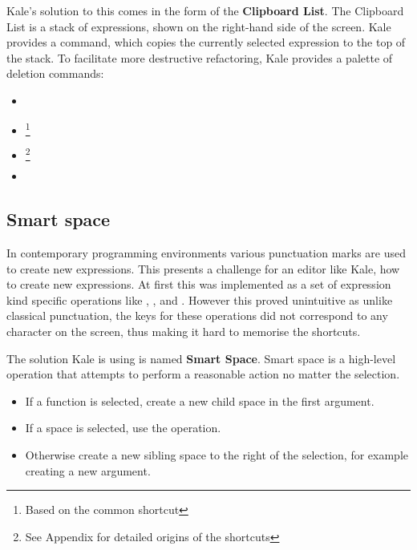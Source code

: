 \documentclass[11pt]{report}
\begin{document}
Kale's solution to this comes in the form of the \textbf{Clipboard List}. The
Clipboard List is a stack of expressions, shown on the right-hand side of the
screen. Kale provides a   command, which copies the currently
selected expression to the top of the stack. To facilitate more destructive
refactoring, Kale provides a palette of deletion commands:

\begin{itemize}[noitemsep]
	\item {} \keys{\backspace}
	\item {} 
		\footnote{Based on the common  shortcut}
	\item {} 
		\footnote{See Appendix for detailed origins of the shortcuts}
	\item {} 
\end{itemize}

\subsection{Smart space}
In contemporary programming environments various punctuation marks are used to
create new expressions. This presents a challenge for an editor like Kale, how
to create new expressions. At first this was implemented as a set of
expression kind specific operations like , , and . However this proved unintuitive as
unlike classical punctuation, the keys for these operations did not correspond
to any character on the screen, thus making it hard to memorise the shortcuts.

The solution Kale is using is named \textbf{Smart Space}. Smart space is a
high-level operation that attempts to perform a reasonable action no matter the
selection.
\begin{itemize}[noitemsep]
	\item If a function is selected, create a new child space in the first
argument.
	\item If a space is selected, use the  
operation.
	\item Otherwise create a new sibling space to the right of the selection, for
example creating a new argument.
\end{itemize}
\end{document}
